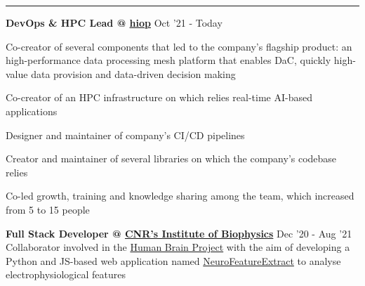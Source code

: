\documentclass[11pt,letterpaper]{article}
\begin{document}
\begin{justify}
      \hrule
      \begin{itemize}[label={}, leftmargin=0pt]
            \begin{item}
                  \textbf{DevOps \& HPC Lead @ \href{https://hiop.io/}{hiop}}
                  \hfill
                  Oct '21 - Today
                  \vspace{-0.15cm}
                  \begin{itemize}[label={$\bullet$}, leftmargin=12.5pt, noitemsep]
                        \begin{item}
                              Co-creator of several components that led to the company's flagship product: an high-performance data processing mesh platform that enables DaC, quickly high-value data provision and data-driven decision making
                        \end{item}
                        \begin{item}
                              Co-creator of an HPC infrastructure on which relies real-time AI-based applications
                        \end{item}
                        \begin{item}
                              Designer and maintainer of company's CI/CD pipelines
                        \end{item}
                        \begin{item}
                              Creator and maintainer of several libraries on which the company's codebase relies
                        \end{item}
                        \begin{item}
                              Co-led growth, training and knowledge sharing among the team, which increased from 5 to 15 people
                        \end{item}
                  \end{itemize}
            \end{item}
            \begin{item}
                  \textbf{Full Stack Developer @ \href{https://www.ibf.cnr.it}{CNR’s Institute of Biophysics}}
                  \hfill
                  Dec '20 - Aug '21
                  \vspace{0.05cm}
                  \\
                  Collaborator involved in the \href{https://www.humanbrainproject.eu/en/}{Human Brain Project} with the aim of developing a Python and JS-based web application named \href{https://hbp-bsp-hhnb.cineca.it/efelg/}{NeuroFeatureExtract} to analyse electrophysiological features

\end{item}
\end{itemize}
\end{justify}
\end{document}
